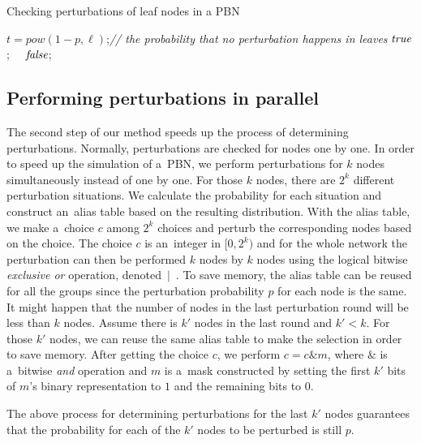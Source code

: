 \documentclass[runningheads,a4paper]{llncs}
\begin{document}
\begin{algorithm}[!t]
\caption{Checking perturbations  of leaf nodes in a PBN}
\label{alg:checkleave}
\begin{algorithmic}[1]
  \State $t=pow(1-p,\ell)$;\hfill{\it // the probability that no perturbation happens in leaves}
	 \Return ${\it true}$;
	\Else~~\Return ${\it false}$;
	\EndIf
\EndProcedure
\end{algorithmic}
\end{algorithm}

\subsection{Performing perturbations in parallel}
\label{ssec:pip}
The second step of our method speeds up the process of determining perturbations.
Normally, perturbations are checked for nodes one by one.
In order to speed up the simulation of a~PBN, we perform perturbations for $k$ nodes simultaneously instead of one by one.
For those $k$ nodes,
there are $2^k$ different perturbation situations.
We calculate the probability for each situation and construct an~alias table based on the
resulting distribution. With the alias table, we make a~choice $c$ among $2^k$ choices
and perturb the corresponding nodes based on the choice.
The choice $c$ is an~integer in $[0, 2^k)$
and for the whole network the perturbation can then be performed $k$ nodes by $k$ nodes using the
logical bitwise \textit{exclusive or} operation, denoted~$|$~.
To save memory, the alias table can be reused for all the groups since the perturbation
probability $p$ for each node is the same. It might happen that the number of nodes in the last
perturbation round will be less than $k$ nodes. Assume there is $k'$ nodes in the last round and
$k'< k$. For those $k'$ nodes, we can reuse the same alias table to make the selection in order to
save memory. After getting the choice $c$, we perform $c=c\&m$, where $\&$ is a~bitwise
\textit{and} operation and $m$ is a~mask constructed by setting the first $k'$ bits of $m$'s
binary representation to $1$ and the remaining bits to $0$.
%
\begin{theorem}
\label{theo:per}
The above process for determining perturbations for the last $k'$ nodes
guarantees that the probability for each of the $k'$ nodes to be perturbed is still $p$.
\end{theorem}
\end{document}
